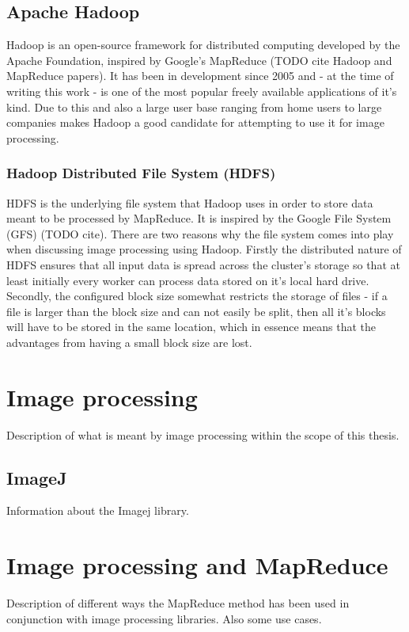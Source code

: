 \documentclass [12pt,a4paper]{report}
\begin{document}
\subsection{Apache Hadoop}
Hadoop is an open-source framework for distributed computing developed by the Apache Foundation, inspired by Google's MapReduce (TODO cite Hadoop and MapReduce papers). It has been in development since 2005 and - at the time of writing this work - is one of the most popular freely available applications of it's kind. Due to this and also a large user base ranging from home users to large companies makes Hadoop a good candidate for attempting to use it for image processing.

\subsubsection{Hadoop Distributed File System (HDFS)}
HDFS is the underlying file system that Hadoop uses in order to store data meant to be processed by MapReduce. It is inspired by the Google File System (GFS) (TODO cite). There are two reasons why the file system comes into play when discussing image processing using Hadoop. Firstly the distributed nature of HDFS ensures that all input data is spread across the cluster's storage so that at least initially every worker can process data stored on it's local hard drive. Secondly, the configured block size somewhat restricts the storage of files - if a file is larger than the block size and can not easily be split, then all it's blocks will have to be stored in the same location, which in essence means that the advantages from having a small block size are lost.

\section{Image processing}
Description of what is meant by image processing within the scope of this thesis.
\subsection{ImageJ}
Information about the Imagej library. 


\section{Image processing and MapReduce}
Description of different ways the MapReduce method has been used in conjunction with image processing libraries. Also some use cases.
\end{document}
